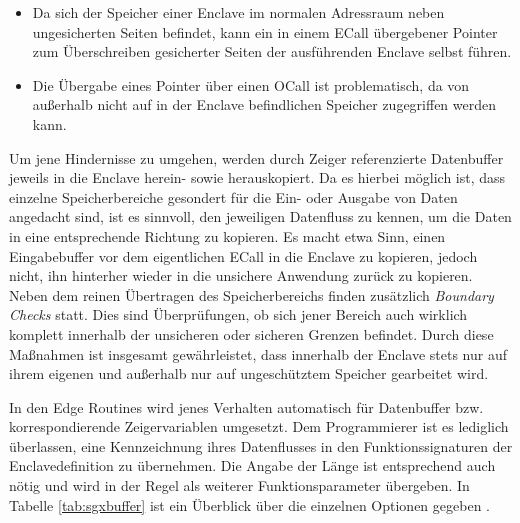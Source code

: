 \begin{itemize}
	\item Da sich der Speicher einer Enclave im normalen Adressraum neben ungesicherten Seiten befindet, kann ein in einem \ac{ECall} übergebener Pointer zum Überschreiben gesicherter Seiten der ausführenden Enclave selbst führen.
	\item Die Übergabe eines Pointer über einen \ac{OCall} ist problematisch, da von außerhalb nicht auf in der Enclave befindlichen Speicher zugegriffen werden kann.
\end{itemize}

Um jene Hindernisse zu umgehen, werden durch Zeiger referenzierte Datenbuffer jeweils in die Enclave herein- sowie herauskopiert. Da es hierbei möglich ist, dass einzelne Speicherbereiche gesondert für die Ein- oder Ausgabe von Daten angedacht sind, ist es sinnvoll, den jeweiligen Datenfluss zu kennen, um die Daten in eine entsprechende Richtung zu kopieren. Es macht etwa Sinn, einen Eingabebuffer vor dem eigentlichen \ac{ECall} in die Enclave zu kopieren, jedoch nicht, ihn hinterher wieder in die unsichere Anwendung  zurück zu kopieren. Neben dem reinen Übertragen des Speicherbereichs finden zusätzlich \textit{Boundary Checks} statt. Dies sind Überprüfungen, ob sich jener Bereich auch wirklich komplett innerhalb der unsicheren oder sicheren Grenzen befindet. Durch diese Maßnahmen ist insgesamt gewährleistet, dass innerhalb der Enclave stets nur auf ihrem eigenen und außerhalb nur auf ungeschütztem Speicher gearbeitet wird.

In den Edge Routines wird jenes Verhalten automatisch für Datenbuffer bzw. korrespondierende Zeigervariablen umgesetzt. Dem Programmierer ist es lediglich überlassen, eine Kennzeichnung ihres Datenflusses in den Funktionssignaturen der Enclavedefinition zu übernehmen. Die Angabe der Länge ist entsprechend auch nötig und wird in der Regel als weiterer Funktionsparameter übergeben. In Tabelle \ref{tab:sgxbuffer} ist ein Überblick über die einzelnen Optionen gegeben \cite{LinuxGuide}.

